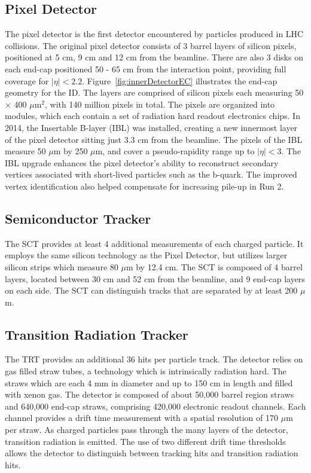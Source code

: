 \subsection{Pixel Detector}
The pixel detector is the first detector encountered by particles produced in LHC collisions. The original pixel detector consists of 3 barrel layers of silicon pixels, positioned at 5 cm, 9 cm and 12 cm from the beamline. There are also 3 disks on each end-cap positioned 50 - 65 cm from the interaction point, providing full coverage for $|\eta| < 2.2$.  Figure~\ref{fig:innerDetectorEC} illustrates the end-cap geometry for the ID. The layers are comprised of silicon pixels each measuring 50 $\times$ 400 $\mu$m$^2$, with 140 million pixels in total. The pixels are organized into modules, which each contain a set of radiation hard readout electronics chips. In 2014, the Insertable B-layer (IBL) was installed, creating a new innermost layer of the pixel detector sitting just 3.3 cm from the beamline. The pixels of the IBL measure 50 $\mu$m by 250 $\mu$m, and cover a pseudo-rapidity range up to $|\eta| < 3$. The IBL upgrade enhances the pixel detector's ability to reconstruct secondary vertices associated with short-lived particles such as the b-quark. The improved vertex identification also helped compensate for increasing pile-up in Run 2. 

\subsection{Semiconductor Tracker}
The SCT provides at least 4 additional measurements of each charged particle. It employs the same silicon technology as the Pixel Detector, but utilizes larger silicon strips which measure 80 $\mu$m by 12.4 cm. The SCT is composed of 4 barrel layers, located between 30 cm and 52 cm from the beamline, and 9 end-cap layers on each side. The SCT can distinguish tracks that are separated by at least 200 $\mu$m.

\subsection{Transition Radiation Tracker}
The TRT provides an additional 36 hits per particle track. The detector relies on gas filled straw tubes, a technology which is intrinsically radiation hard. The straws which are each 4 mm in diameter and up to 150 cm in length and filled with xenon gas. The detector is composed of about 50,000 barrel region straws and 640,000 end-cap straws, comprising 420,000 electronic readout channels. Each channel provides a drift time measurement with a spatial resolution of 170 $\mu$m per straw. As charged particles pass through the many layers of the detector, transition radiation is emitted. The use of two different drift time thresholds allows the detector to distinguish between tracking hits and transition radiation hits. 

